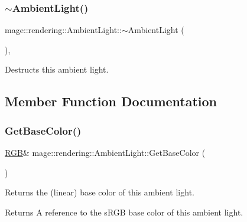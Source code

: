 \subsubsection{\texorpdfstring{$\sim$\+Ambient\+Light()}{~AmbientLight()}}
{\footnotesize\ttfamily mage\+::rendering\+::\+Ambient\+Light\+::$\sim$\+Ambient\+Light (\begin{DoxyParamCaption}{ }\end{DoxyParamCaption})\hspace{0.3cm}{\ttfamily [virtual]}, {\ttfamily [default]}}

Destructs this ambient light. 

\subsection{Member Function Documentation}
\mbox{\label{classmage_1_1rendering_1_1_ambient_light_ad4e1f6726b09f690d2abcdfd536d3908}} 
\subsubsection{\texorpdfstring{Get\+Base\+Color()}{GetBaseColor()}\hspace{0.1cm}{\footnotesize\ttfamily [1/2]}}
{\footnotesize\ttfamily \mbox{\hyperlink{structmage_1_1_r_g_b}{R\+GB}}\& mage\+::rendering\+::\+Ambient\+Light\+::\+Get\+Base\+Color (\begin{DoxyParamCaption}{ }\end{DoxyParamCaption})\hspace{0.3cm}{\ttfamily [noexcept]}}

Returns the (linear) base color of this ambient light.

\begin{DoxyReturn}{Returns}
A reference to the s\+R\+GB base color of this ambient light. 
\end{DoxyReturn}
\mbox{\label{classmage_1_1rendering_1_1_ambient_light_a68266fb710e72997d9bb0a02d7f5d416}} 
